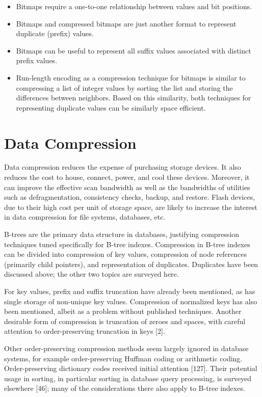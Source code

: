 \begin{itemize}
\item
  Bitmaps require a one-to-one relationship between values and bit
  positions.
\item
  Bitmaps and compressed bitmaps are just another format to represent
  duplicate (prefix) values.
\item
  Bitmaps can be useful to represent all suffix values associated with
  distinct prefix values.
\item
  Run-length encoding as a compression technique for bitmaps is similar
  to compressing a list of integer values by sorting the list and
  storing the differences between neighbors. Based on this similarity,
  both techniques for representing duplicate values can be similarly
  space efficient.
\end{itemize}

\hypertarget{data-compression}{%
\section{Data Compression}\label{data-compression}}

Data compression reduces the expense of purchasing storage devices. It
also reduces the cost to house, connect, power, and cool these devices.
Moreover, it can improve the effective scan bandwidth as well as the
bandwidths of utilities such as defragmentation, consistency checks,
backup, and restore. Flash devices, due to their high cost per unit of
storage space, are likely to increase the interest in data compression
for file systems, databases, etc.

B-trees are the primary data structure in databases, justifying
compression techniques tuned specifically for B-tree indexes.
Compression in B-tree indexes can be divided into compression of key
values, compression of node references (primarily child pointers), and
representation of duplicates. Duplicates have been discussed above; the
other two topics are surveyed here.

For key values, prefix and suffix truncation have already been
mentioned, as has single storage of non-unique key values. Compression
of normalized keys has also been mentioned, albeit as a problem without
published techniques. Another desirable form of compression is
truncation of zeroes and spaces, with careful attention to
order-preserving truncation in keys {[}2{]}.

Other order-preserving compression methods seem largely ignored in
database systems, for example order-preserving Huffman coding or
arithmetic coding. Order-preserving dictionary codes received initial
attention {[}127{]}. Their potential usage in sorting, in particular
sorting in database query processing, is surveyed elsewhere {[}46{]};
many of the considerations there also apply to B-tree indexes.

